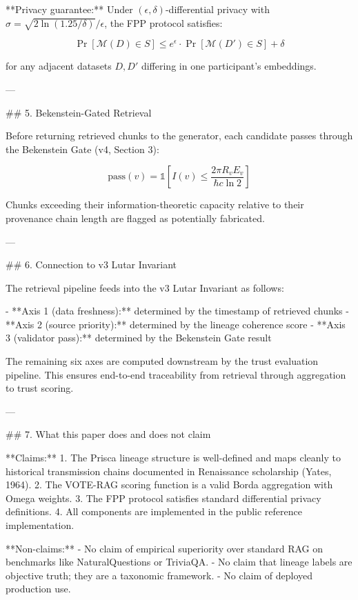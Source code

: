 **Privacy guarantee:** Under \( (\epsilon, \delta) \)-differential privacy with \( \sigma = \sqrt{2 \ln(1.25/\delta)} / \epsilon \), the FPP protocol satisfies:

\[
\Pr[\mathcal{M}(D) \in S] \leq e^\epsilon \cdot \Pr[\mathcal{M}(D') \in S] + \delta
\]

for any adjacent datasets \( D, D' \) differing in one participant's embeddings.

---

## 5. Bekenstein-Gated Retrieval

Before returning retrieved chunks to the generator, each candidate passes through the Bekenstein Gate (v4, Section 3):

\[
\text{pass}(v) = \mathbb{1}\left[ I(v) \leq \frac{2\pi R_v E_v}{\hbar c \ln 2} \right]
\]

Chunks exceeding their information-theoretic capacity relative to their provenance chain length are flagged as potentially fabricated.

---

## 6. Connection to v3 Lutar Invariant

The retrieval pipeline feeds into the v3 Lutar Invariant as follows:

- **Axis 1 (data freshness):** determined by the timestamp of retrieved chunks
- **Axis 2 (source priority):** determined by the lineage coherence score
- **Axis 3 (validator pass):** determined by the Bekenstein Gate result

The remaining six axes are computed downstream by the trust evaluation pipeline. This ensures end-to-end traceability from retrieval through aggregation to trust scoring.

---

## 7. What this paper does and does not claim

**Claims:**
1. The Prisca lineage structure is well-defined and maps cleanly to historical transmission chains documented in Renaissance scholarship (Yates, 1964).
2. The VOTE-RAG scoring function is a valid Borda aggregation with Omega weights.
3. The FPP protocol satisfies standard differential privacy definitions.
4. All components are implemented in the public reference implementation.

**Non-claims:**
- No claim of empirical superiority over standard RAG on benchmarks like NaturalQuestions or TriviaQA.
- No claim that lineage labels are objective truth; they are a taxonomic framework.
- No claim of deployed production use.

